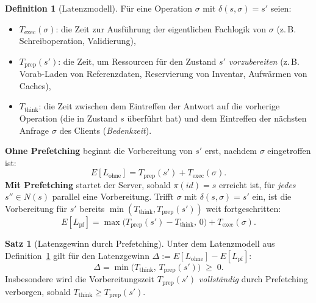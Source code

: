 ﻿\documentclass[a4paper,12pt]{article}
\theoremstyle{definition}
\newtheorem{definition}{Definition}
\newtheorem{satz}{Satz}
\begin{document}
\begin{definition}[Latenzmodell]
	\label{def:latenzmodell}
	Für eine Operation $\sigma$ mit $\delta(s,\sigma)=s'$ seien:
	\begin{itemize}
		\item $T_{\mathrm{exec}}(\sigma)$: die Zeit zur Ausführung der eigentlichen
		      Fachlogik von $\sigma$ (z.\,B. Schreiboperation, Validierung),
		\item $T_{\mathrm{prep}}(s')$: die Zeit, um Ressourcen für den Zustand $s'$
		      \emph{vorzubereiten} (z.\,B. Vorab-Laden von Referenzdaten, Reservierung von
		      Inventar, Aufwärmen von Caches),
		\item $T_{\mathrm{think}}$: die Zeit zwischen dem Eintreffen der Antwort auf die
		      vorherige Operation (die in Zustand $s$ überführt hat) und dem Eintreffen
		      der nächsten Anfrage $\sigma$ des Clients (\emph{Bedenkzeit}).
	\end{itemize}
	\textbf{Ohne Prefetching} beginnt die Vorbereitung von $s'$ erst, nachdem $\sigma$
	eingetroffen ist:
	\[
		E[L_{\text{ohne}}] = T_{\mathrm{prep}}(s') + T_{\mathrm{exec}}(\sigma).
	\]
	\textbf{Mit Prefetching} startet der Server, sobald $\pi(id)=s$ erreicht ist, für
	\emph{jedes} $s'' \in N(s)$ parallel eine Vorbereitung. Trifft $\sigma$ mit
	$\delta(s,\sigma)=s'$ ein, ist die Vorbereitung für $s'$ bereits
	$\min(T_{\mathrm{think}}, T_{\mathrm{prep}}(s'))$ weit fortgeschritten:
	\[
		E[L_{\mathrm{pf}}] = \max\bigl(T_{\mathrm{prep}}(s') - T_{\mathrm{think}},\, 0\bigr)
		+ T_{\mathrm{exec}}(\sigma).
	\]
\end{definition}

\begin{satz}[Latenzgewinn durch Prefetching]
	\label{satz:latenzgewinn}
	Unter dem Latenzmodell aus Definition~\ref{def:latenzmodell} gilt für den
	Latenzgewinn $\Delta := E[L_{\text{ohne}}] - E[L_{\mathrm{pf}}]$:
	\[
		\Delta = \min\bigl(T_{\mathrm{think}},\, T_{\mathrm{prep}}(s')\bigr) \;\geq\; 0.
	\]
	Insbesondere wird die Vorbereitungszeit $T_{\mathrm{prep}}(s')$ \emph{vollständig}
	durch Prefetching verborgen, sobald $T_{\mathrm{think}} \geq T_{\mathrm{prep}}(s')$.
\end{satz}
\end{document}
